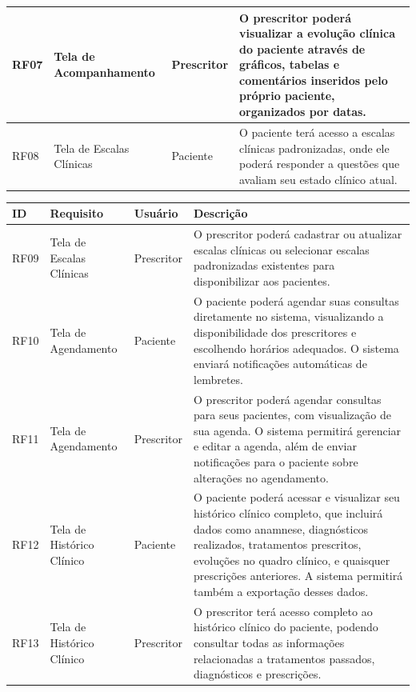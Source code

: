 \href{}{}\documentclass[12pt,portuguese,oneside]{article}
\begin{document}
\begin{table}[H]
\begin{tabularx}{\textwidth}{|>{\raggedright\arraybackslash}p{1cm}|>{\raggedright\arraybackslash}p{2.5cm}|>{\raggedright\arraybackslash}p{2cm}|>{\raggedright\arraybackslash}X|}
\hline
RF07 & Tela de Acompanhamento & Prescritor & O prescritor poderá visualizar a evolução clínica do paciente através de gráficos, tabelas e comentários inseridos pelo próprio paciente, organizados por datas.\\
\hline
RF08 & Tela de Escalas Clínicas & Paciente & O paciente terá acesso a escalas clínicas padronizadas, onde ele poderá responder a questões que avaliam seu estado clínico atual.\\
\hline
\end{tabularx}
\end{table}

\newpage

\begin{table}[H]
\centering
{}
\begin{tabularx}{\textwidth}{|>{\raggedright\arraybackslash}p{1cm}|>{\raggedright\arraybackslash}p{3cm}|>{\raggedright\arraybackslash}p{2cm}|>{\raggedright\arraybackslash}X|}
\hline
\rowcolor{gray!20}
\textbf{ID} & \textbf{Requisito} & \textbf{Usuário} & \textbf{Descrição}\\
\hline
RF09 & Tela de Escalas Clínicas & Prescritor & O prescritor poderá cadastrar ou atualizar escalas clínicas ou selecionar escalas padronizadas existentes para disponibilizar aos pacientes.\\
\hline
RF10 & Tela de Agendamento & Paciente & O paciente poderá agendar suas consultas diretamente no sistema, visualizando a disponibilidade dos prescritores e escolhendo horários adequados. O sistema enviará notificações automáticas de lembretes.\\
\hline
RF11 & Tela de Agendamento & Prescritor & O prescritor poderá agendar consultas para seus pacientes, com visualização de sua agenda. O sistema permitirá gerenciar e editar a agenda, além de enviar notificações para o paciente sobre alterações no agendamento.\\
\hline
RF12 & Tela de Histórico Clínico & Paciente & O paciente poderá acessar e visualizar seu histórico clínico completo, que incluirá dados como anamnese, diagnósticos realizados, tratamentos prescritos, evoluções no quadro clínico, e quaisquer prescrições anteriores. A sistema permitirá também a exportação desses dados.\\
\hline
RF13 & Tela de Histórico Clínico & Prescritor & O prescritor terá acesso completo ao histórico clínico do paciente, podendo consultar todas as informações relacionadas a tratamentos passados, diagnósticos e prescrições.\\

\end{tabularx}
\end{table}
\end{document}
